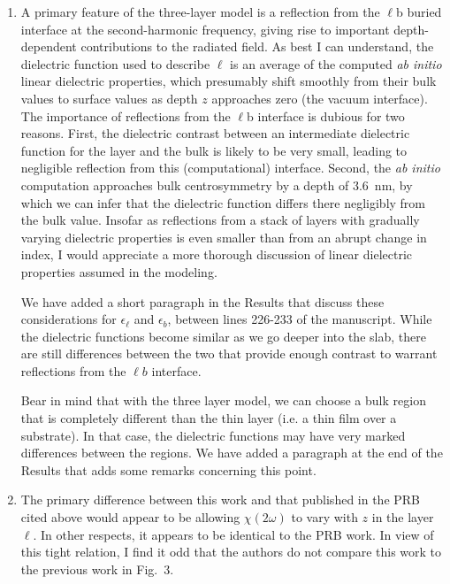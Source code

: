 \documentclass{article}
\begin{document}
\begin{enumerate}[label=\alph*.]
\item A primary feature of the three-layer model is a reflection from the
$\ell$b buried interface at the second-harmonic frequency, giving rise to
important depth-dependent contributions to the radiated field. As best I
can understand, the dielectric function used to describe $\ell$ is an
average of the computed \emph{ab initio} linear dielectric properties,
which presumably shift smoothly from their bulk values to surface values
as depth $z$ approaches zero (the vacuum interface). The importance of
reflections from the $\ell$b interface is dubious for two reasons. First,
the dielectric contrast between an intermediate dielectric function for
the layer and the bulk is likely to be very small, leading to negligible
reflection from this (computational) interface. Second, the \emph{ab
initio} computation approaches bulk centrosymmetry by a depth of
\SI{3.6}{nm}, by which we can infer that the dielectric function differs
there negligibly from the bulk value. Insofar as reflections from a stack
of layers with gradually varying dielectric properties is even smaller
than from an abrupt change in index, I would appreciate a more thorough 
discussion of linear dielectric properties assumed in the modeling.

\begin{shaded}
We have added a short paragraph in the Results that discuss these considerations for $\epsilon_{\ell}$ and $\epsilon_{b}$, between lines 226-233 of the manuscript. While the dielectric functions become similar as we go deeper into the slab, there are still differences between the two that provide enough contrast to warrant reflections from the $\ell b$ interface.

Bear in mind that with the three layer model, we can choose a bulk region that is completely different than the thin layer (i.e. a thin film over a substrate). In that case, the dielectric functions may have very marked differences between the regions. We have added a paragraph at the end of the Results that adds some remarks concerning this point.
\end{shaded}

\item The primary difference between this work and that published in the PRB
cited above would appear to be allowing $\chi(2\omega)$ to vary with $z$
in the layer $\ell$. In other respects, it appears to be identical to the
PRB work. In view of this tight relation, I find it odd that the authors
do not compare this work to the previous work in Fig.\ 3.


\end{enumerate}
\end{document}
